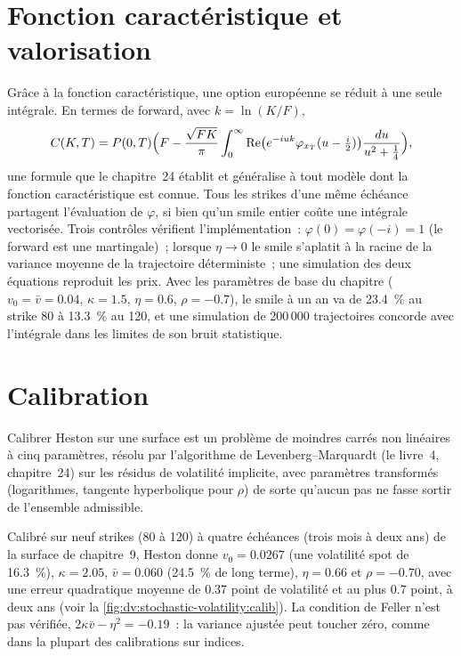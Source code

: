 \section{Fonction caractéristique et valorisation}

Grâce à la fonction caractéristique, une option européenne se réduit à une seule intégrale. En termes de forward, avec
$k=\ln(K/F)$,
\begin{equation}\label{eq:dv:stochastic-volatility:lewis}
C(K,T)=P(0,T)\Bigl(F-\frac{\sqrt{FK}}{\pi}\int_0^\infty\operatorname{Re}\bigl(e^{-iuk}
\varphi_{x_T}(u-\tfrac i2)\bigr)\frac{du}{u^2+\frac14}\Bigr),
\end{equation}
une formule que le chapitre~24 établit et généralise à tout modèle dont la fonction caractéristique est connue.
Tous les strikes d'une même échéance partagent l'évaluation de $\varphi$, si bien qu'un smile entier coûte une
intégrale vectorisée. Trois contrôles vérifient l'implémentation~: $\varphi(0)=\varphi(-i)=1$ (le
forward est une martingale)~; lorsque $\eta\to0$ le smile s'aplatit à la racine de la variance moyenne de la
trajectoire déterministe~; une simulation des deux équations reproduit les prix. Avec les paramètres de base du
chapitre ($v_0=\bar v=0.04$, $\kappa=1.5$, $\eta=0.6$, $\rho=-0.7$), le smile à un an va de
23.4~\% au strike 80 à 13.3~\% au 120, et une simulation de 200\,000 trajectoires concorde avec l'intégrale dans les
limites de son bruit statistique.

\section{Calibration}

Calibrer Heston sur une surface est un problème de moindres carrés non linéaires à cinq paramètres, résolu par
l'algorithme de Levenberg--Marquardt (le livre~4, chapitre~24) sur les résidus de volatilité implicite, avec
paramètres transformés (logarithmes, tangente hyperbolique pour $\rho$) de sorte qu'aucun pas ne fasse
sortir de l'ensemble admissible.

\begin{example}\label{ex:dv:stochastic-volatility:calib}
Calibré sur neuf strikes (80 à 120) à quatre échéances (trois mois à deux ans) de la surface de
chapitre~9, Heston donne $v_0=0.0267$ (une volatilité spot de 16.3~\%), $\kappa=2.05$, $\bar v=0.060$
(24.5~\% de long terme), $\eta=0.66$ et $\rho=-0.70$, avec une erreur quadratique moyenne de 0.37 point de volatilité
et au plus 0.7 point, à deux ans (voir la \cref{fig:dv:stochastic-volatility:calib}). La condition
de Feller n'est pas vérifiée, $2\kappa\bar v-\eta^2=-0.19$~: la variance ajustée peut toucher zéro, comme dans la plupart des calibrations sur
indices.
\end{example}

